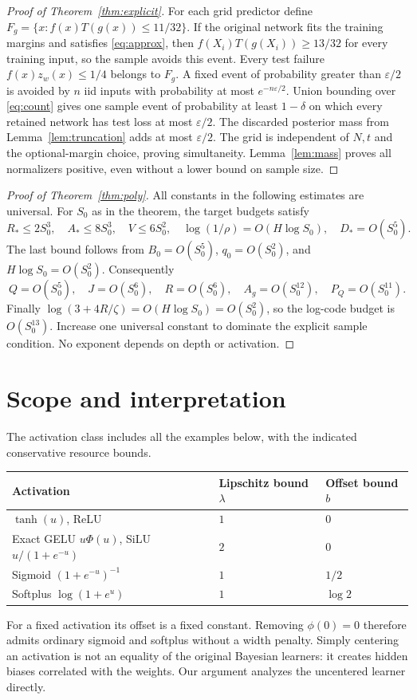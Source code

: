 \documentclass[11pt]{article}
\begin{document}
\begin{proof}[Proof of Theorem~\ref{thm:explicit}]
For each grid predictor define
$F_g=\{x:f(x)T(g(x))\le11/32\}$.
If the original network fits the training margins and satisfies
\eqref{eq:approx}, then $f(X_i)T(g(X_i))\ge13/32$ for every training input,
so the sample avoids this event. Every test failure $f(x)z_w(x)\le1/4$
belongs to $F_g$. A fixed event of probability greater than
$\varepsilon/2$ is avoided by $n$ iid inputs with probability at most
$e^{-n\varepsilon/2}$. Union bounding over \eqref{eq:count} gives one
sample event of probability at least $1-\delta$ on which every retained
network has test loss at most $\varepsilon/2$.
The discarded posterior mass from Lemma~\ref{lem:truncation} adds at most
$\varepsilon/2$. The grid is independent of $N,t$ and the optional-margin
choice, proving simultaneity. Lemma~\ref{lem:mass} proves all normalizers
positive, even without a lower bound on sample size.
\end{proof}

\begin{proof}[Proof of Theorem~\ref{thm:poly}]
All constants in the following estimates are universal. For $S_0$ as in
the theorem, the target budgets satisfy
\[
 R_*\le2S_0^3,\quad A_*\le8S_0^3,\quad V\le6S_0^2,
 \quad \log(1/\rho)=O(H\log S_0),\quad D_*=O(S_0^5).
\]
The last bound follows from $B_0=O(S_0^5)$,
$q_0=O(S_0^2)$, and $H\log S_0=O(S_0^2)$.
Consequently
\[
 Q=O(S_0^5),\quad J=O(S_0^6),\quad R=O(S_0^6),\quad
 A_g=O(S_0^{12}),\quad P_Q=O(S_0^{11}).
\]
Finally $\log(3+4R/\zeta)=O(H\log S_0)=O(S_0^2)$, so the log-code
budget is $O(S_0^{13})$. Increase one universal constant to dominate the
explicit sample condition. No exponent depends on depth or activation.
\end{proof}

\section{Scope and interpretation}
The activation class includes all the examples below, with the indicated
conservative resource bounds.
\begin{center}
\begin{tabular}{lll}\toprule
Activation & Lipschitz bound $\lambda$ & Offset bound $b$\\\midrule
$\tanh(u)$, ReLU & $1$ & $0$\\
Exact GELU $u\Phi(u)$, SiLU $u/(1+e^{-u})$ & $2$ & $0$\\
Sigmoid $(1+e^{-u})^{-1}$ & $1$ & $1/2$\\
Softplus $\log(1+e^u)$ & $1$ & $\log2$\\\bottomrule
\end{tabular}
\end{center}
For a fixed activation its offset is a fixed constant. Removing
$\phi(0)=0$ therefore admits ordinary sigmoid and softplus without a
width penalty. Simply centering an activation is not an equality of the
original Bayesian learners: it creates hidden biases correlated with the
weights. Our argument analyzes the uncentered learner directly.
\end{document}
